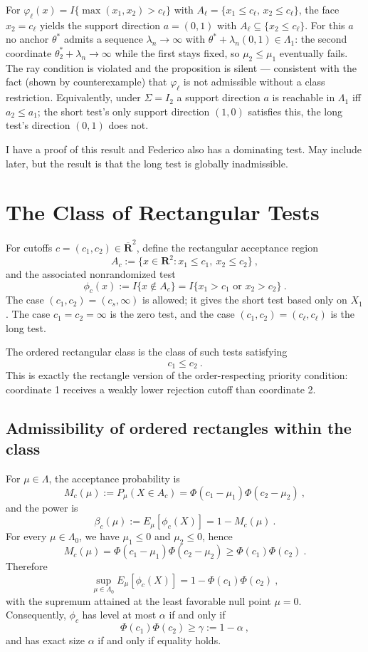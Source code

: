 \documentclass[12pt]{article}
\theoremstyle{definition}
\theoremstyle{remark}
\begin{document}
For $\varphi_\ell(x)= I\{\max(x_1,x_2)>c_\ell\}$ with $A_\ell=\{x_1\le c_\ell,\,x_2\le c_\ell\}$, the face $x_2=c_\ell$ yields the support direction $a=(0,1)$ with $A_\ell\subseteq\{x_2\le c_\ell\}$. For this $a$ no anchor $\theta^*$ admits a sequence $\lambda_n\to\infty$ with $\theta^*+\lambda_n(0,1)\in\Lambda_1$: the second coordinate $\theta^*_2+\lambda_n\to\infty$ while the first stays fixed, so $\mu_2\le\mu_1$ eventually fails. The ray condition is violated and the proposition is silent --- consistent with the fact (shown by counterexample) that $\varphi_\ell$ is not admissible without a class restriction. Equivalently, under $\Sigma=I_2$ a support direction $a$ is reachable in $\Lambda_1$ iff $a_2\le a_1$; the short test's only support direction $(1,0)$ satisfies this, the long test's direction $(0,1)$ does not.

I have a proof of this result and Federico also has a dominating test. May include later, but the result is that the long test is globally inadmissible.  


\section*{The Class of Rectangular Tests}
 
For cutoffs $c=(c_1,c_2)\in \overline{\mathbf R}^2$, define the rectangular acceptance region
\[
A_c:=\{x\in\mathbf R^2:x_1\le c_1,\ x_2\le c_2\}~,
\]
and the associated nonrandomized test
\[
\phi_c(x):= I \{x\notin A_c\}
=I \{x_1>c_1\text{ or }x_2>c_2\}~.
\]
The case $(c_1,c_2)=(c_s,\infty)$ is allowed; it gives the short test based only on $X_1$.  The case $c_1=c_2=\infty$ is the zero test, and the case  $(c_1,c_2)=(c_{\ell},c_{\ell})$ is the long test.
 
The ordered rectangular class is the class of such tests satisfying
\[
c_1\le c_2~.
\]
This is exactly the rectangle version of the order-respecting priority condition: coordinate 1 receives a weakly lower rejection cutoff than coordinate 2.
 
\subsection*{Admissibility of ordered rectangles within the class}
For $\mu\in\Lambda$, the acceptance probability is
\begin{equation}\label{eq:miss-probability}
    M_c(\mu):=
    P_\mu(X\in A_c)
    =
    \Phi(c_1-\mu_1)\Phi(c_2-\mu_2)~,
\end{equation}
and the power is
\[
\beta_c(\mu) := E_\mu[\phi_c(X)] = 1-M_c(\mu)~.
\]
For every $\mu\in\Lambda_0$, we have $\mu_1\le0$ and $\mu_2\le0$, hence
\[
M_c(\mu) = \Phi(c_1-\mu_1)\Phi(c_2-\mu_2) \ge \Phi(c_1)\Phi(c_2)~.
\]
Therefore
\[
\sup_{\mu\in\Lambda_0}E_\mu[\phi_c(X)] = 1 - \Phi(c_1)\Phi(c_2)~,
\]
with the supremum attained at the least favorable null point $\mu=0$. Consequently, $\phi_c$ has level at most $\alpha$ if and only if 
\begin{equation}\label{eq:level-constraint}
\Phi(c_1)\Phi(c_2)\ge \gamma := 1-\alpha~,
\end{equation}
and has exact size $\alpha$ if and only if equality holds.
 
\end{document}
